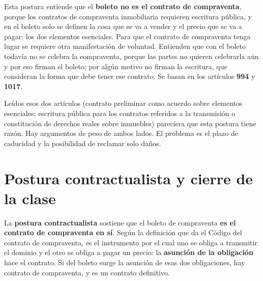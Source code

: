 \documentclass[12pt,oneside]{book}
\begin{document}
Esta postura entiende que el \textbf{boleto no es el contrato de compraventa}, porque los contratos de compraventa inmobiliaria requieren escritura pública, y en el boleto solo se definen la cosa que se va a vender y el precio que se va a pagar: los dos elementos esenciales. Para que el contrato de compraventa tenga lugar se requiere otra manifestación de voluntad. Entienden que con el boleto todavía no se celebra la compraventa, porque las partes no quieren celebrarla aún y por eso firman el boleto; por algún motivo no firman la escritura, que consideran la forma que debe tener ese contrato. Se basan en los artículos \textbf{994} y \textbf{1017}.

Leídos esos dos artículos (contrato preliminar como acuerdo sobre elementos esenciales; escritura pública para los contratos referidos a la transmisión o constitución de derechos reales sobre inmuebles) pareciera que esta postura tiene razón. Hay argumentos de peso de ambos lados. El problema es el plazo de caducidad y la posibilidad de reclamar solo daños.

\section{Postura contractualista y cierre de la clase}

La \textbf{postura contractualista} sostiene que el boleto de compraventa \textbf{es el contrato de compraventa en sí}. Según la definición que da el Código del contrato de compraventa, es el instrumento por el cual uno se obliga a transmitir el dominio y el otro se obliga a pagar un precio: la \textbf{asunción de la obligación} hace el contrato. Si del boleto surge la asunción de esas dos obligaciones, hay contrato de compraventa, y es un contrato definitivo.
\end{document}
